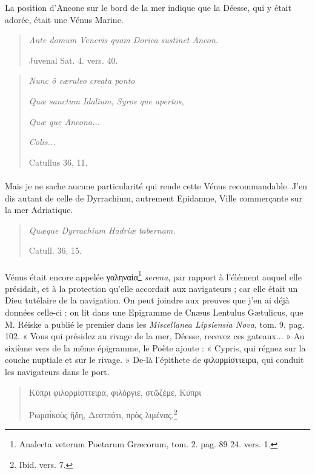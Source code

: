 \documentclass[a4paper, 11pt, oneside, polutonikogreek, french]{article}
\begin{document}
La position d'Ancone sur le bord de la mer indique que la Déesse, qui y était adorée, était une Vénus Marine.
\begin{quotation}
\emph{Ante domum Veneris quam Dorica sustinet Ancon.}

\hspace*{30mm}Juvenal Sat. 4. vers. 40.
\end{quotation}
\begin{quotation}
\emph{Nunc ô cæruleo creata ponto}

\emph{Quæ sanctum Idalium, Syros que apertos,}

\emph{Quæ que Ancona...}

\emph{Colis...}

\hspace*{30mm}Catullus 36, 11.
\end{quotation}
\paragraph{}
Mais je ne sache aucune particularité qui rende cette Vénus recommandable. J'en dis autant de celle de Dyrrachium, autrement Epidamne, Ville commerçante sur la mer Adriatique.
\begin{quotation}
\emph{Quæque Dyrrachium Hadriæ tabernam.}

\hspace*{30mm}Catull. 36, 15.
\end{quotation}
\paragraph{}
Vénus était encore appelée γαληναία\footnote{Analecta veterum Poetarum Græcorum, tom. 2. pag. 89 24. vers. 1.} \emph{serena}, par rapport à l'élément auquel elle présidait, et à la protection qu'elle accordait aux navigateurs ; car elle était un Dieu tutélaire de la navigation. On peut joindre aux preuves que j'en ai déjà données celle-ci : on lit dans une Epigramme de Cnæus Lentulus Gætulicus, que M. Réiske a publié le premier dans les \emph{Miscellanea Lipsiensia Nova}, tom. 9, pag. 102. « Vous qui présidez au rivage de la mer, Déesse, recevez ces gateaux... » Au sixième vers de la même épigramme, le Poète ajoute : « Cypris, qui régnez sur la couche nuptiale et sur le rivage. » De-là l'épithete de φιλορμίσττειρα, qui conduit les navigateurs dans le port.
\begin{quotation}
Κύπρι φιλορμίσττειρα, φιλόργιε, στῶζέμε, Κύπρι

Ρωμαῒκοὺς ἤδη, Δεστπότι, πρὸς λιμένας.\footnote{Ibid. vers. 7.}
\end{quotation}
\end{document}
